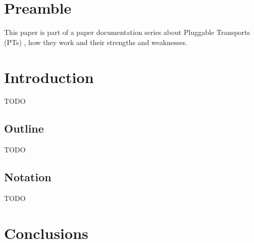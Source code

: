 \documentclass[sigconf, screen]{acmart}
\begin{document}
\maketitle

\section*{Preamble}
\label{s:preamble}
This paper is part of a paper documentation series about Pluggable Transports (PTs) \cite{TorPluggableTransports}, how they work and their strengths and weaknesses.
\section{Introduction}
\label{s:introduction}
TODO
\subsection{Outline}
\label{ss:outline}
TODO
\subsection{Notation}
\label{ss:notation}
TODO
\section{Conclusions}
\label{s:conclusions}
\appendix
\end{document}
